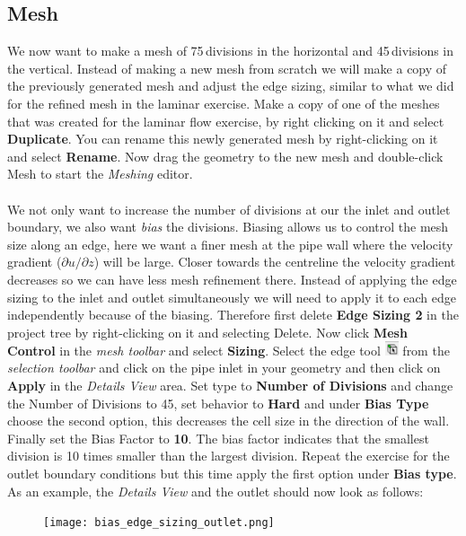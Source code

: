 \documentclass[11pt,a4paper,oneside]{scrartcl}
\newcommand\bfr[1]{\textcolor[rgb]{1,0.00,0.00}{\textbf{\textsf{#1}}}}
\begin{document}
\subsection{Mesh}
We now want to make a mesh of 75\,divisions in the horizontal and 45\,divisions in the vertical. Instead of making a new mesh from scratch we will make a copy of the previously generated mesh and adjust the edge sizing, similar to what we did for the refined mesh in the laminar exercise.
Make a copy of one of the meshes that was created for the laminar flow exercise, by right clicking on it and select \bfr{Duplicate}. You can  rename this newly generated mesh by right-clicking on it and select \bfr{Rename}. Now drag the geometry to the new mesh and double-click Mesh to start the \emph{Meshing} editor.
\\
\\
We not only want to increase the number of divisions at our the inlet and outlet boundary, we also want \emph{bias} the divisions. Biasing allows us to control the mesh size along an edge, here we want a finer mesh at the pipe wall where the velocity gradient ($\partial u/\partial z$) will be large. Closer towards the centreline the velocity gradient decreases so we can have less mesh refinement there. Instead of applying the edge sizing to the inlet and outlet simultaneously we will need to apply it to each edge independently because of the biasing. Therefore first delete \bfr{Edge Sizing 2} in the project tree by right-clicking on it and selecting Delete. Now click \bfr{Mesh Control} in the \emph{mesh toolbar} and select \bfr{Sizing}. Select the edge tool \includegraphics[width=0.4cm]{edge_tool.png}  from the \emph{selection toolbar} and click on the pipe inlet in your geometry and then click on \bfr{Apply} in the \emph{Details View} area. Set type to \bfr{Number of Divisions} and change the Number of Divisions to 45, set behavior to \bfr{Hard} and under \bfr{Bias Type} choose the second option, this decreases the cell size in the direction of the wall. Finally set the Bias Factor to \bfr{10}. The bias factor indicates that the smallest division is 10 times smaller than the largest division. Repeat the exercise for the outlet boundary conditions but this time apply the first option under \bfr{Bias type}. As an example, the \emph{Details View} and the outlet should now look as follows:

\begin{figure}[H]
\begin{center}
\texttt{[image: bias\_edge\_sizing\_outlet.png]}
\end{center}
\end{figure}
\end{document}
